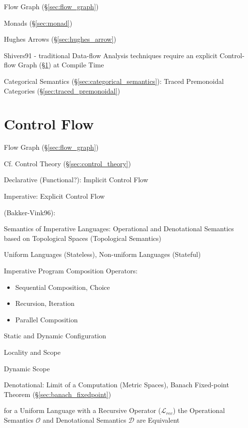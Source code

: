 \fist Flow Graph (\S\ref{sec:flow_graph})

Monads (\S\ref{sec:monad})

Hughes Arrows (\S\ref{sec:hughes_arrow})

Shivers91 - traditional Data-flow Analysis techniques require an
explicit Control-flow Graph (\S\ref{sec:control_flow}) at Compile Time

Categorical Semantics (\S\ref{sec:categorical_semantics}): Traced
Premonoidal Categories (\S\ref{sec:traced_premonoidal})



\section{Control Flow}\label{sec:control_flow}

\fist Flow Graph (\S\ref{sec:flow_graph})

\fist Cf. Control Theory (\S\ref{sec:control_theory})

Declarative (Functional?): Implicit Control Flow

Imperative: Explicit Control Flow

(Bakker-Vink96):

Semantics of Imperative Languages: Operational and Denotational
Semantics based on Topological Spaces (Topological Semantics)

Uniform Languages (Stateless), Non-uniform Languages (Stateful)

Imperative Program Composition Operators:
\begin{itemize}
  \item Sequential Composition, Choice
  \item Recursion, Iteration
  \item Parallel Composition
\end{itemize}

Static and Dynamic Configuration

Locality and Scope

Dynamic Scope

Denotational: Limit of a Computation (Metric Spaces), Banach
Fixed-point Theorem (\S\ref{sec:banach_fixedpoint}) %

for a Uniform Language with a Recursive Operator ($\mathcal{L}_{rec}$)
the Operational Semantics $\mathcal{O}$ and Denotational Semantics
$\mathcal{D}$ are Equivalent

